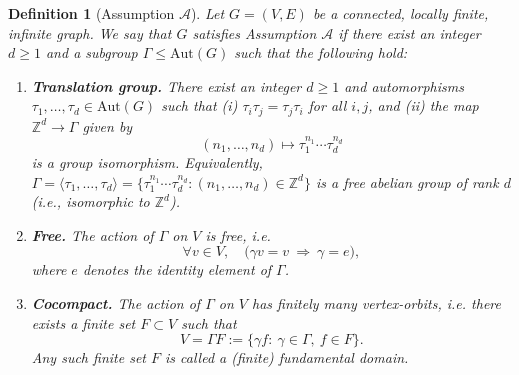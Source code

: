 \documentclass[10pt,a4paper]{amsart}
\newtheorem{definition}{Definition}
\begin{document}
\begin{definition}[Assumption $\mathcal{A}$]\label{def:assumptionA}
Let $G=(V,E)$ be a connected, locally finite, infinite graph.
We say that $G$ satisfies \emph{Assumption $\mathcal{A}$} if there exist an integer $d\ge 1$
and a subgroup $\Gamma\le \mathrm{Aut}(G)$ such that the following hold:

\begin{enumerate}

\item \textbf{Translation group.}
There exist an integer $d\ge 1$ and automorphisms $\tau_1,\dots,\tau_d\in \mathrm{Aut}(G)$ such that
(i) $\tau_i\tau_j=\tau_j\tau_i$ for all $i,j$, and
(ii) the map $\mathbb{Z}^d\to\Gamma$ given by
\[
(n_1,\dots,n_d)\longmapsto \tau_1^{n_1}\cdots \tau_d^{n_d}
\]
is a group isomorphism. Equivalently, $\Gamma=\langle\tau_1,\dots,\tau_d\rangle=\{\tau_1^{n_1}\cdots\tau_d^{n_d}:(n_1,\dots,n_d)\in\mathbb{Z}^d\}$ is a free abelian group of rank $d$
(i.e., isomorphic to $\mathbb{Z}^d$).


\item \textbf{Free.}
The action of $\Gamma$ on $V$ is free, i.e.
\[
\forall v\in V,\quad \bigl(\gamma v = v \ \Rightarrow\  \gamma = e\bigr),
\]
where $e$ denotes the identity element of $\Gamma$.

\item \textbf{Cocompact.}
The action of $\Gamma$ on $V$ has finitely many vertex-orbits, i.e. there exists a finite set
$F\subset V$ such that
\[
V = \Gamma F := \{\gamma f:\ \gamma\in\Gamma,\ f\in F\}.
\]
Any such finite set $F$ is called a \emph{(finite) fundamental domain}.

\end{enumerate}
\end{definition}
\end{document}
